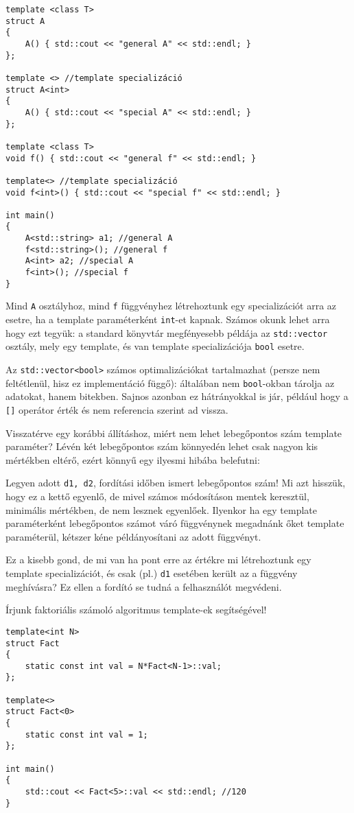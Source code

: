 \documentclass[a4paper,11.5pt,table]{article}
\begin{document}
	\begin{lstlisting}
template <class T>
struct A
{
	A()	{ std::cout << "general A" << std::endl; }
};

template <> //template specializáció
struct A<int>
{
	A() { std::cout << "special A" << std::endl; }
};

template <class T>
void f() { std::cout << "general f" << std::endl; }

template<> //template specializáció
void f<int>() { std::cout << "special f" << std::endl; }

int main() 
{
	A<std::string> a1; //general A
	f<std::string>(); //general f
	A<int> a2; //special A
	f<int>(); //special f
}
	\end{lstlisting}
	Mind \texttt{A} osztályhoz, mind \texttt{f} függvényhez létrehoztunk egy specializációt arra az esetre, ha a template paraméterként \texttt{int}-et kapnak. Számos okunk lehet arra hogy ezt tegyük: a standard könyvtár megfényesebb példája az \texttt{std::vector} osztály, mely egy template, és van template specializációja \texttt{bool} esetre.
	\begin{note}
		Az \texttt{std::vector<bool>} számos optimalizációkat tartalmazhat (persze nem feltétlenül, hisz ez implementáció függő): általában nem \texttt{bool}-okban tárolja az adatokat, hanem bitekben. Sajnos azonban ez hátrányokkal is jár, például hogy a \texttt{[]} operátor érték és nem referencia szerint ad vissza.
	\end{note}
	\begin{note}
		Visszatérve egy korábbi állításhoz, miért nem lehet lebegőpontos szám template paraméter? Lévén két lebegőpontos szám könnyedén lehet csak nagyon kis mértékben eltérő, ezért könnyű egy ilyesmi hibába belefutni: 
		
		Legyen adott \texttt{d1, d2}, fordítási időben ismert lebegőpontos szám! Mi azt hisszük, hogy ez a kettő egyenlő, de mivel számos módosításon mentek keresztül, minimális mértékben, de nem lesznek egyenlőek. Ilyenkor ha egy template paraméterként lebegőpontos számot váró függvénynek megadnánk őket template paraméterül, kétszer kéne példányosítani az adott függvényt.
		
		Ez a kisebb gond, de mi van ha pont erre az értékre mi létrehoztunk egy template specializációt, és csak (pl.) \texttt{d1} esetében került az a függvény meghívásra? Ez ellen a fordító se tudná a felhasználót megvédeni.
	\end{note}
	Írjunk faktoriális számoló algoritmus template-ek segítségével!
	\begin{lstlisting}
template<int N>                           
struct Fact 
{                             
	static const int val = N*Fact<N-1>::val;
};

template<>                                
struct Fact<0>
{                          
	static const int val = 1;               
};               

int main() 
{                                          
	std::cout << Fact<5>::val << std::endl; //120
}
	\end{lstlisting}
\end{document}
